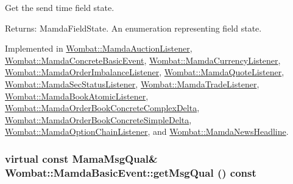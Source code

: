 Get the send time field state. 

\begin{Desc}
\item[Returns:]Mamda\-Field\-State. An enumeration representing field state. \end{Desc}


Implemented in \hyperlink{classWombat_1_1MamdaAuctionListener_721c4b24c7a188038665f28fc03e45c2}{Wombat::Mamda\-Auction\-Listener}, \hyperlink{classWombat_1_1MamdaConcreteBasicEvent_894b9605d54c499704d238e07c37cb79}{Wombat::Mamda\-Concrete\-Basic\-Event}, \hyperlink{classWombat_1_1MamdaCurrencyListener_5cbf04e2668f868816b2d7b6461d97dc}{Wombat::Mamda\-Currency\-Listener}, \hyperlink{classWombat_1_1MamdaOrderImbalanceListener_938d4210b58560bf6ee8cb155546a3d8}{Wombat::Mamda\-Order\-Imbalance\-Listener}, \hyperlink{classWombat_1_1MamdaQuoteListener_751c64ca7bad56ffc99ca72e1494fb01}{Wombat::Mamda\-Quote\-Listener}, \hyperlink{classWombat_1_1MamdaSecStatusListener_dce997a03b809f9d8f3adc1f1cce3d82}{Wombat::Mamda\-Sec\-Status\-Listener}, \hyperlink{classWombat_1_1MamdaTradeListener_1a7d2527a9aa376990eb4f50a799996a}{Wombat::Mamda\-Trade\-Listener}, \hyperlink{classWombat_1_1MamdaBookAtomicListener_158632d4f501353404c44410f71555c4}{Wombat::Mamda\-Book\-Atomic\-Listener}, \hyperlink{classWombat_1_1MamdaOrderBookConcreteComplexDelta_a15e8f6d486cd6748799f064ae2955fd}{Wombat::Mamda\-Order\-Book\-Concrete\-Complex\-Delta}, \hyperlink{classWombat_1_1MamdaOrderBookConcreteSimpleDelta_d72939b490f7bc0b99b3c704fbbff641}{Wombat::Mamda\-Order\-Book\-Concrete\-Simple\-Delta}, \hyperlink{classWombat_1_1MamdaOptionChainListener_6034b14704cebdcddf147a4cf9316637}{Wombat::Mamda\-Option\-Chain\-Listener}, and \hyperlink{classWombat_1_1MamdaNewsHeadline_fc1ffb1b9bcb412afe19dee561bac49f}{Wombat::Mamda\-News\-Headline}.\hypertarget{classWombat_1_1MamdaBasicEvent_675ce8f1de581548426335423d6b3864}{
\subsubsection[getMsgQual]{\setlength{\rightskip}{0pt plus 5cm}virtual const Mama\-Msg\-Qual\& Wombat::Mamda\-Basic\-Event::get\-Msg\-Qual () const}}
\label{classWombat_1_1MamdaBasicEvent_675ce8f1de581548426335423d6b3864}


